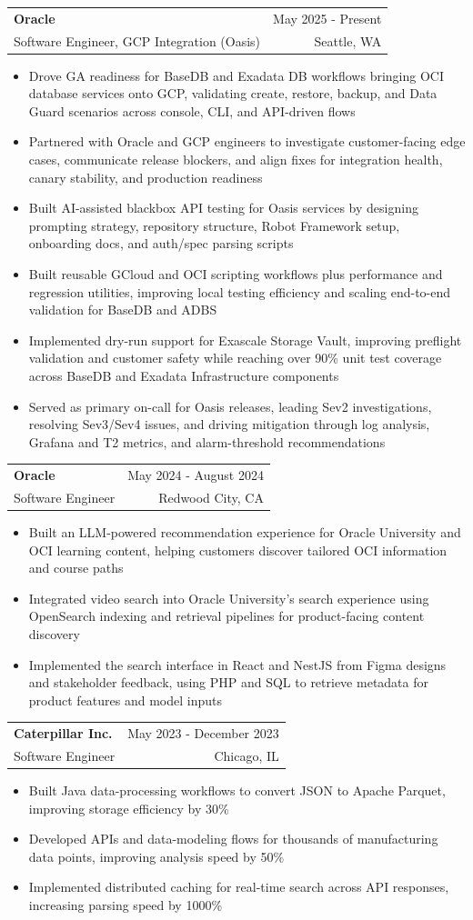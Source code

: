 \documentclass[letterpaper,11pt]{article}
\makeatletter
\newcommand{\resumeItem}[1]{
  \item\small{
    {#1 \vspace{-1pt}}
  }
}
\newcommand{\resumeSubheading}[4]{
  \vspace{-2pt}\item
    \begin{tabular*}{0.97\textwidth}[t]{l@{\extracolsep{\fill}}r}
      \textbf{#1} & #2 \\
      {\small#3} & {\small #4} \\
    \end{tabular*}\vspace{-7pt}
}
\newcommand{\resumeItemListStart}{\begin{itemize}[leftmargin=0.18in,itemsep=1pt,topsep=2pt]}
\newcommand{\resumeItemListEnd}{\end{itemize}\vspace{-5pt}}
\makeatother
\begin{document}
    \resumeSubheading
  {Oracle}{May 2025 - Present}
  {Software Engineer, GCP Integration (Oasis)}{Seattle, WA}
  \resumeItemListStart
    \resumeItem{Drove GA readiness for BaseDB and Exadata DB workflows bringing OCI database services onto GCP, validating create, restore, backup, and Data Guard scenarios across console, CLI, and API-driven flows}
    \resumeItem{Partnered with Oracle and GCP engineers to investigate customer-facing edge cases, communicate release blockers, and align fixes for integration health, canary stability, and production readiness}
    \resumeItem{Built AI-assisted blackbox API testing for Oasis services by designing prompting strategy, repository structure, Robot Framework setup, onboarding docs, and auth/spec parsing scripts}
    \resumeItem{Built reusable GCloud and OCI scripting workflows plus performance and regression utilities, improving local testing efficiency and scaling end-to-end validation for BaseDB and ADBS}
    \resumeItem{Implemented dry-run support for Exascale Storage Vault, improving preflight validation and customer safety while reaching over 90\% unit test coverage across BaseDB and Exadata Infrastructure components}
    \resumeItem{Served as primary on-call for Oasis releases, leading Sev2 investigations, resolving Sev3/Sev4 issues, and driving mitigation through log analysis, Grafana and T2 metrics, and alarm-threshold recommendations}
  \resumeItemListEnd

    \resumeSubheading
      {Oracle}{May 2024 - August 2024}
      {Software Engineer}{Redwood City, CA}
      \resumeItemListStart
        \resumeItem{Built an LLM-powered recommendation experience for Oracle University and OCI learning content, helping customers discover tailored OCI information and course paths}
        \resumeItem{Integrated video search into Oracle University's search experience using OpenSearch indexing and retrieval pipelines for product-facing content discovery}
        \resumeItem{Implemented the search interface in React and NestJS from Figma designs and stakeholder feedback, using PHP and SQL to retrieve metadata for product features and model inputs}
      \resumeItemListEnd

    \resumeSubheading
      {Caterpillar Inc.}{May 2023 - December 2023}
      {Software Engineer}{Chicago, IL}
      \resumeItemListStart
        \resumeItem{Built Java data-processing workflows to convert JSON to Apache Parquet, improving storage efficiency by 30\%}
        \resumeItem{Developed APIs and data-modeling flows for thousands of manufacturing data points, improving analysis speed by 50\%}
        \resumeItem{Implemented distributed caching for real-time search across API responses, increasing parsing speed by 1000\%}
      \resumeItemListEnd
\end{document}
